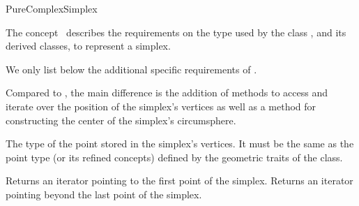 \begin{ccRefConcept}{PureComplexSimplex}

\ccDefinition

The concept \ccRefName\ describes the requirements on the type used by the
class , and its derived classes, to
represent a simplex.

\ccRefines


We only list below the additional specific requirements of \ccRefName.

Compared to , the main difference is the addition of
methods to access and iterate over the position of the simplex's vertices as
well as a method for constructing the center of the simplex's circumsphere.

\ccHasModels


\ccTypes

%
{The type of the point stored in the simplex's vertices. It must be the same
as the point type  (or its refined concepts)
defined by the geometric traits of the 
class.}



\ccOperations

{Returns an iterator pointing to the first point of the simplex.}
\ccGlue
{}
{Returns an iterator pointing beyond the last point of the simplex.}


\ccSeeAlso

\\
\\

\end{ccRefConcept}
